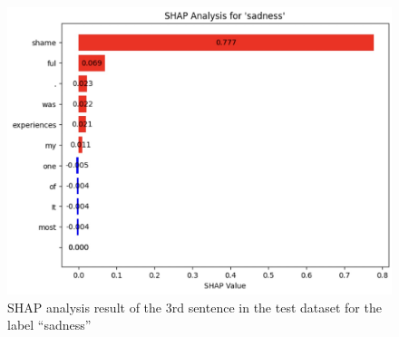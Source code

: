 \documentclass[11pt]{article}
\begin{document}
\begin{figure}[htp]
    \centering
    \includegraphics[width=0.8\linewidth]{images/figure2.jpg}
    \caption{SHAP analysis result of the 3rd sentence in the test dataset for the label “sadness”}
    \label{fig:figure2}
\end{figure}

\clearpage
\twocolumn
\end{document}
